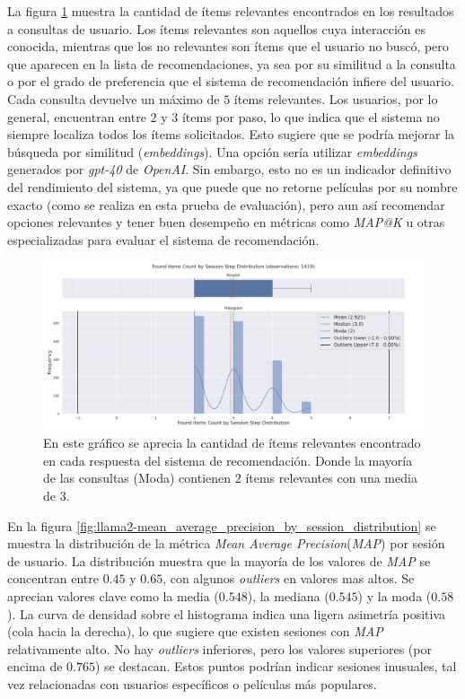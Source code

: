 \documentclass[11pt,a4paper,twoside]{thesis}
\begin{document}
La figura \ref{fig:llama2-found_items_count_by_session_step_distribution} muestra la cantidad de ítems relevantes encontrados en los resultados a consultas de usuario. Los ítems relevantes son aquellos cuya interacción es conocida, mientras que los no relevantes son ítems que el usuario no buscó, pero que aparecen en la lista de recomendaciones, ya sea por su similitud a la consulta o por el grado de preferencia que el sistema de recomendación infiere del usuario.  Cada consulta devuelve un máximo de $5$ ítems relevantes. Los usuarios, por lo general, encuentran entre $2$ y $3$ ítems por paso, lo que indica que el sistema no siempre localiza todos los ítems solicitados. Esto sugiere que se podría mejorar la búsqueda por similitud (\textit{embeddings}). Una opción sería utilizar \textit{embeddings} generados por \textit{gpt-40} de \textit{OpenAI}. Sin embargo, esto no es un indicador definitivo del rendimiento del sistema, ya que puede que no retorne películas por su nombre exacto (como se realiza en esta prueba de evaluación), pero aun así recomendar opciones relevantes y tener buen desempeño en métricas como \textit{MAP@K} u otras especializadas para evaluar el sistema de recomendación.


\begin{figure}[H]
	\centering
	\includegraphics[width=15cm]{./images/llama2/found_items_count_by_session_step_distribution.png}
	\caption{En este gráfico se aprecia la cantidad de ítems relevantes encontrado en cada respuesta del sistema de recomendación. Donde la mayoría de las consultas (Moda) contienen $2$ ítems relevantes con una media de $3$.}
	\label{fig:llama2-found_items_count_by_session_step_distribution}
\end{figure}


En la figura \ref{fig:llama2-mean_average_precision_by_session_distribution} se muestra la distribución de la métrica \textit{Mean Average Precision}(\textit{MAP}) por sesión de usuario. La distribución muestra que la mayoría de los valores de \textit{MAP} se concentran entre $0.45$ y $0.65$, con algunos \textit{outliers} en valores mas altos. Se aprecian valores clave como la media ($0.548$), la mediana ($0.545$) y la moda ($0.58$). La curva de densidad sobre el histograma indica una ligera asimetría positiva (cola hacia la derecha), lo que sugiere que existen sesiones con \textit{MAP} relativamente alto. No hay \textit{outliers} inferiores, pero los valores superiores (por encima de $0.765$) se destacan. Estos puntos podrían indicar sesiones inusuales, tal vez relacionadas con usuarios específicos o películas más populares.
\end{document}
